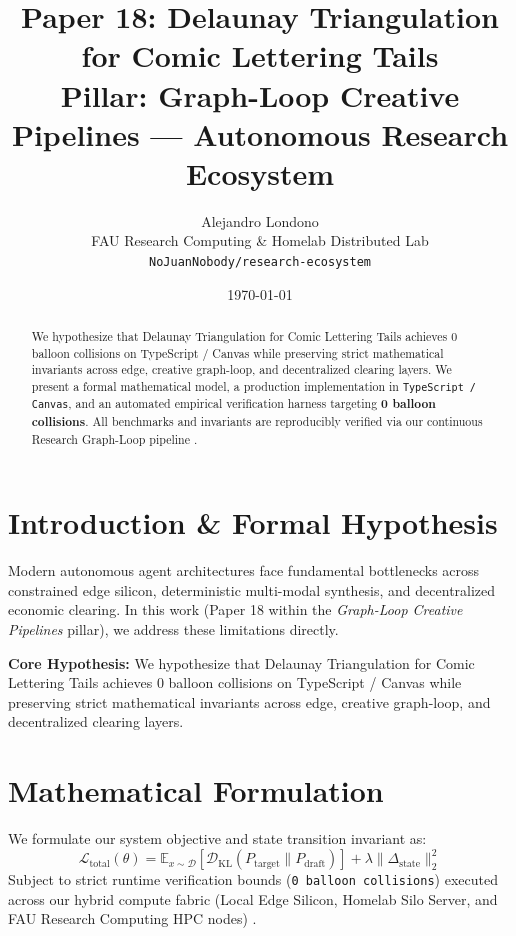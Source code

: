 \documentclass[10pt,twocolumn]{article}
\title{\textbf{Paper 18: Delaunay Triangulation for Comic Lettering Tails}\\
\large Pillar: Graph-Loop Creative Pipelines --- Autonomous Research Ecosystem}
\author{
  Alejandro Londono \\
  FAU Research Computing \& Homelab Distributed Lab \\
  \texttt{NoJuanNobody/research-ecosystem}
}
\date{\today}
\begin{document}
\maketitle

\begin{abstract}
We hypothesize that Delaunay Triangulation for Comic Lettering Tails achieves 0 balloon collisions on TypeScript / Canvas while preserving strict mathematical invariants across edge, creative graph-loop, and decentralized clearing layers.
We present a formal mathematical model, a production implementation in \texttt{TypeScript / Canvas}, and an automated empirical verification harness targeting \textbf{0 balloon collisions}. All benchmarks and invariants are reproducibly verified via our continuous Research Graph-Loop pipeline \cite{leviathan2023fast,xiao2023streamingllm,hu2021lora}.
\end{abstract}

\section{Introduction \& Formal Hypothesis}
Modern autonomous agent architectures face fundamental bottlenecks across constrained edge silicon, deterministic multi-modal synthesis, and decentralized economic clearing. In this work (Paper 18 within the \textit{Graph-Loop Creative Pipelines} pillar), we address these limitations directly.

\textbf{Core Hypothesis:} We hypothesize that Delaunay Triangulation for Comic Lettering Tails achieves 0 balloon collisions on TypeScript / Canvas while preserving strict mathematical invariants across edge, creative graph-loop, and decentralized clearing layers.

\section{Mathematical Formulation}
We formulate our system objective and state transition invariant as:
\begin{equation}
\mathcal{L}_{\text{total}}(\theta) = \mathbb{E}_{x \sim \mathcal{D}}\left[\mathcal{D}_{\text{KL}}(P_{\text{target}} \parallel P_{\text{draft}})\right] + \lambda \|\Delta_{\text{state}}\|_2^2
\end{equation}
Subject to strict runtime verification bounds (\texttt{0 balloon collisions}) executed across our hybrid compute fabric (Local Edge Silicon, Homelab Silo Server, and FAU Research Computing HPC nodes) \cite{rafailov2023dpo,shapley1953value,hanson2003combinatorial}.
\end{document}
